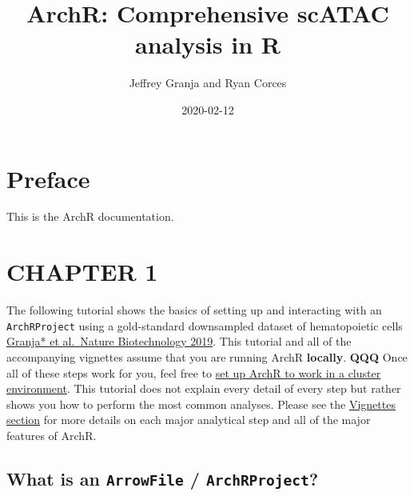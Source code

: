 \documentclass[
  12pt,
]{krantz}
\title{ArchR: Comprehensive scATAC analysis in R}
\author{Jeffrey Granja and Ryan Corces}
\date{2020-02-12}
\begin{document}
\maketitle

\thispagestyle{empty}

\setlength{\abovedisplayskip}{-5pt}
\setlength{\abovedisplayshortskip}{-5pt}

{
\hypersetup{linkcolor=}
\setcounter{tocdepth}{2}
\tableofcontents
}
\listoftables
\listoffigures
\hypertarget{preface}{%
\chapter*{Preface}\label{preface}}


This is the ArchR documentation.

\hypertarget{chapter-1}{%
\chapter{CHAPTER 1}\label{chapter-1}}

The following tutorial shows the basics of setting up and interacting with an \texttt{ArchRProject} using a gold-standard downsampled dataset of hematopoietic cells \href{https://www.ncbi.nlm.nih.gov/pubmed/31792411}{Granja* et al.~Nature Biotechnology 2019}. This tutorial and all of the accompanying vignettes assume that you are running ArchR \textbf{locally}. \textbf{QQQ} Once all of these steps work for you, feel free to \href{articles/Articles/clusterComputing.html}{set up ArchR to work in a cluster environment}. This tutorial does not explain every detail of every step but rather shows you how to perform the most common analyses. Please see the \href{articles/index.html}{Vignettes section} for more details on each major analytical step and all of the major features of ArchR.

\hypertarget{what-is-an-arrowfile-archrproject}{%
\section{\texorpdfstring{What is an \texttt{ArrowFile} / \texttt{ArchRProject}?}{What is an ArrowFile / ArchRProject?}}\label{what-is-an-arrowfile-archrproject}}
\end{document}
